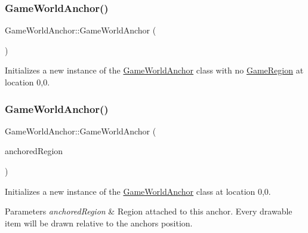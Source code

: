 \subsubsection{\texorpdfstring{Game\+World\+Anchor()}{GameWorldAnchor()}\hspace{0.1cm}{\footnotesize\ttfamily [1/3]}}
{\footnotesize\ttfamily Game\+World\+Anchor\+::\+Game\+World\+Anchor (\begin{DoxyParamCaption}{ }\end{DoxyParamCaption})}



Initializes a new instance of the \hyperlink{class_game_world_anchor}{Game\+World\+Anchor} class with no \hyperlink{class_game_region}{Game\+Region} at location 0,0. 

\mbox{\label{class_game_world_anchor_a65f7f152f39e2bbe2e76e6c7fffaeb93}} 
\subsubsection{\texorpdfstring{Game\+World\+Anchor()}{GameWorldAnchor()}\hspace{0.1cm}{\footnotesize\ttfamily [2/3]}}
{\footnotesize\ttfamily Game\+World\+Anchor\+::\+Game\+World\+Anchor (\begin{DoxyParamCaption}\item[{\hyperlink{class_game_region}{Game\+Region} $\ast$}]{anchored\+Region }\end{DoxyParamCaption})\hspace{0.3cm}{\ttfamily [explicit]}}



Initializes a new instance of the \hyperlink{class_game_world_anchor}{Game\+World\+Anchor} class at location 0,0. 


\begin{DoxyParams}{Parameters}
{\em anchored\+Region} & Region attached to this anchor. Every drawable item will be drawn relative to the anchors position. \\
\hline
\end{DoxyParams}
\mbox{\label{class_game_world_anchor_a0c6a75a46de880453962859d3d15e56e}} 
